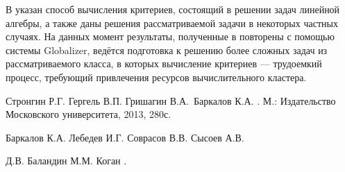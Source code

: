 \documentclass[11pt, oneside, a4paper]{article}
\begin{document}
В \cite{optControl} указан способ вычисления критериев, состоящий в решении задач линейной алгебры,
а также даны решения рассматриваемой задачи в некоторых частных случаях. На
данных момент результаты, полученные в \cite{optControl} повторены с помощью системы Globalizer,
ведётся подготовка к решению более сложных задач из рассматриваемого класса, в которых
вычисление критериев --- трудоемкий процесс, требующий привлечения ресурсов вычислительного кластера.

\begin{biblio}

Стронгин Р.Г. Гергель В.П. Гришагин
  В.А.~Баркалов К.А.
.
\newblock М.: Издательство Московского
  университета, 2013, 280с.

Баркалов К.А. Лебедев И.Г. Соврасов В.В. Сысоев А.В.

 Д.В. Баландин М.М. Коган
 .

\end{biblio}
\end{document}
